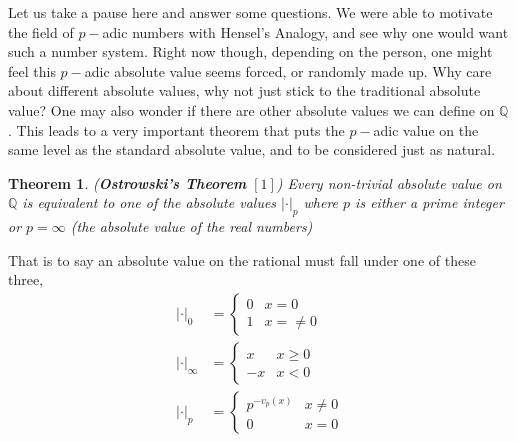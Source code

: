 \documentclass[12pt]{article}
\newtheorem{thm}{Theorem}[section]
\theoremstyle{definition}
\theoremstyle{remark}
\newcommand{\qq}{\mathbb Q}   %
\newcommand{\abs}[1]{\left\lvert#1\right\rvert} %
\renewcommand{\geq}{\geqslant}
\newcommand{\lrb}[1]{\left[#1\right]}
\begin{document}
    Let us take a pause here and answer some questions. We were able to motivate the field of $p-$adic numbers with Hensel's Analogy, and see why one would want such a number system. Right now though, depending on the person, one might feel this $p-$adic absolute value seems forced, or randomly made up. Why care about different absolute values, why not just stick to the traditional absolute value? One may also wonder if there are other absolute values we can define on $\qq$. This leads to a very important theorem that puts the $p-$adic value on the same level as the standard absolute value, and to be considered just as natural. 
\newpage
    \begin{thm} (\textbf{Ostrowski's Theorem} $\lrb{1}$) Every non-trivial absolute value on $\qq$ is equivalent to one of the absolute values $\abs{\cdot}_p$ where $p$ is either a prime integer or $p = \infty $ (the absolute value of the real numbers)
    \end{thm}
    That is to say an absolute value on the rational must fall under one of these three,
    \begin{align*}
      \abs{\cdot}_0 &= \begin{cases}
        0 & x = 0 \\
        1 & x = \neq 0
      \end{cases} \\
      \abs{\cdot}_\infty &= \begin{cases}
        x & x\geq 0 \\
        -x & x < 0 
      \end{cases} \\
      \abs{\cdot}_p &= \begin{cases}
        p^{-v_p(x)} & x \neq 0 \\
        0 & x = 0
      \end{cases}
    \end{align*}
\end{document}
